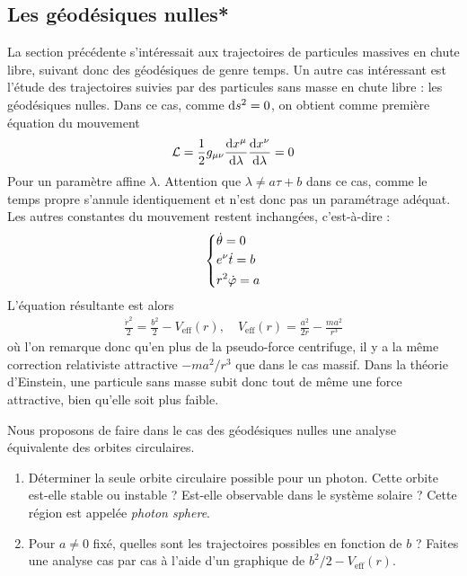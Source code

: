 \subsection{Les géodésiques nulles*}
La section précédente s'intéressait aux trajectoires de particules massives en chute libre, suivant donc des géodésiques de genre temps. Un autre cas intéressant est l'étude des trajectoires suivies par des particules sans masse en chute libre : les géodésiques nulles. Dans ce cas, comme $\mathrm{d} s^2 = 0$, on obtient comme première équation du mouvement
\begin{equation}
    \mathcal{L} = \frac{1}{2} g_{\mu\nu} \frac{\mathrm{d} x^\mu}{\mathrm{d} \lambda} \frac{\mathrm{d} x^\nu}{\mathrm{d} \lambda} = 0
\end{equation}
Pour un paramètre affine $\lambda$. Attention que $\lambda \neq a\tau +b$ dans ce cas, comme le temps propre s'annule identiquement et n'est donc pas un paramétrage adéquat. Les autres constantes du mouvement restent inchangées, c'est-à-dire :
\begin{align}
    \begin{dcases}
        \dot{\theta} = 0 \\
        e^\nu \dot{t} = b \\
        r^2 \dot{\varphi} = a
    \end{dcases}
\end{align}
L'équation résultante est alors
\begin{align}
    \label{Géodésiques nulles de Schwarzschild}
    \boxed{\frac{\dot{r}^2}{2} = \frac{b^2}{2} - V_\text{eff} (r), \quad V_\text{eff} (r) = \frac{a^2}{2r} - \frac{ma^2}{r^3}}
\end{align}
où l'on remarque donc qu'en plus de la pseudo-force centrifuge, il y a la même correction relativiste attractive $-ma^2/r^3$ que dans le cas massif. Dans la théorie d'Einstein, une particule sans masse subit donc tout de même une force attractive, bien qu'elle soit plus faible.
\begin{exerc}
    Nous proposons de faire dans le cas des géodésiques nulles une analyse équivalente des orbites circulaires.
    \begin{enumerate}
        \item[a.] Déterminer la seule orbite circulaire possible pour un photon. Cette orbite est-elle stable ou instable ? Est-elle observable dans le système solaire ? Cette région est appelée \emph{photon sphere}.
        \item[b.] Pour $a \neq 0$ fixé, quelles sont les trajectoires possibles en fonction de $b$ ? Faites une analyse cas par cas à l'aide d'un graphique de $b^2/2 - V_\text{eff}(r)$.
    \end{enumerate}
\end{exerc}
